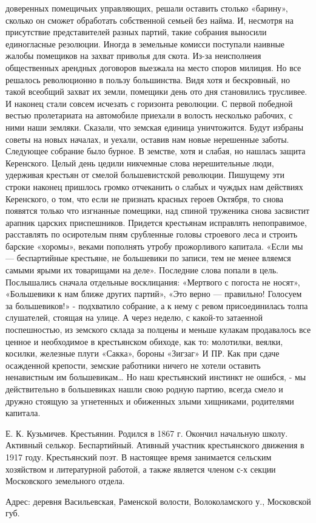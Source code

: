 доверенных помещичьих управляющих, решали оставить столько «барину», сколько он сможет обработать собственной семьей без найма. И, несмотря на присутствие представителей разных партий, такие собрания выносили единогласные резолюции. Иногда в земельные комисси поступали наивные жалобы помещиков на захват приволья для скота. Из-за неисполнеия общественных арендных договоров выезжала на место споров милиция. Но все решалось революционно в пользу большинства. Видя хотя и бескровный, но такой всеобщий захват их земли, помещики день ото дня становились трусливее. И наконец стали совсем исчезать с горизонта революции. С первой победной вестью пролетариата на автомобиле приехали в волость несколько рабочих, с ними наши земляки. Сказали, что земская единица уничтожится. Будут избраны советы на новых началах, и уехали, оставив нам новые нерешенные заботы. Следующее собрание было бурное. В земстве, хотя и слабая, но нашлась защита Керенского. Целый день цедили никчемные слова нерешительные люди, удерживая крестьян от смелой большевистской революции. Пишущему эти строки наконец пришлось громко отчеканить о слабых и чуждых нам действиях Керенского, о том, что если не признать красных героев Октября, то снова появятся только что изгнанные помещики, над спиной труженика снова засвистит арапник царских приспешников. Придется крестьянам исправлять непоправимое, расставлять по осиротелым пням срубленные головы строевого леса и строить барские «хоромы», веками пополнять утробу прожорливого капитала. «Если мы — беспартийные крестьяне, не большевики по записи, тем не менее вляемся самыми ярыми их товарищами на деле». Последние слова попали в цель. Послышались сначала отдельные восклицания: «Мертвого с погоста не носят», «Большевики к нам ближе других партий», «Это верно — правильно! Голосуем за большевиков!» - подхватило собрание, а к нему с ревом присоединилась толпа слушателей, стоящая на улице. А через неделю, с какой-то затаенной поспешностью, из земского склада за полцены и меньше кулакам продавалось все ценное и необходимое в крестьянском обиходе, как то: молотилки, веялки, косилки, железные плуги «Сакка», бороны «Зигзаг» И ПР. Как при сдаче осажденной крепости, земские работники ничего не хотели оставить ненавистным им большевикам… Но наш крестьянский инстинкт не ошибся, - мы действительно в большевиках нашли свою родную партию, всегда смело и дружно стоящую за угнетенных и обиженных злыми хищниками, родителями капитала.

Е. К. Кузьмичев. Крестьянин. Родился в 1867 г. Окончил начальную школу. Активный селькор. Беспартийный. Ативный участник крестьянского движения в 1917 году. Крестьянский поэт. В настоящее время занимается сельским хозяйством и литературной работой, а также является членом с-х секции Московского земельного отдела.

Адрес: деревня Васильевская, Раменской волости, Волоколамского у., Московской губ.
